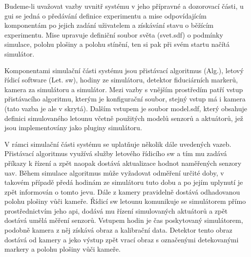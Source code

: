     Budeme-li uvažovat vazby uvnitř systému v jeho přípravné a dozorovací části, u \acrshort{gui} se jedná o předávání definice experimentu a mise odpovídajícím komponentám po jejich zadání uživatelem a získávání stavu o běžícím experimentu. Mise upravuje definiční soubor světa (svet.sdf) o podmínky simulace, polohu plošiny a polohu stínění, ten si pak při svém startu načítá simulátor.

    Komponentami simulační části systému jsou přistávací algoritmus (Alg.), letový řídicí software (Let. \acrshort{sw}), hodiny ze simulátoru, detektor fiduciárních markerů, kamera za simulátoru a simulátor. Mezi vazby s vnějším prostředím patří vstup přistávacího algoritmu, kterým je konfigurační soubor, stejný vstup má i kamera (tato vazba je ale v  skrytá). Dalším vstupem je soubor model.sdf, který obsahuje definici simulovaného letounu včetně použitých modelů senzorů a aktuátorů, jež jsou implementovány jako pluginy simulátoru.

    V rámci simulační části systému se uplatňuje několik dále uvedených vazeb. Přistávací algoritmus využívá služby letového řídicího \acrshort{sw} a tím mu zadává příkazy k řízení a zpět naopak dostává aktualizace hodnot naměřených senzory \acrshort{uav}. Během simulace algoritmus může vyžadovat odměření určité doby, v takovém případě předá hodinám ze simulátoru tuto dobu a po jejím uplynutí je zpět informován o tomto jevu. Dále z kamery pravidelně dostává odhadovanou polohu plošiny vůči kameře. Řídicí \acrshort{sw} letounu komunikuje se simulátorem přímo prostřednictvím jeho \acrshort{api}, dodává mu řízení simulovaných aktuátorů a zpět dostává umělá měření senzorů. Vstupem hodin je čas poskytovaný simulátorem, podobně kamera z něj získává obraz a kalibrační data. Detektor tento obraz dostává od kamery a jeko výstup zpět vrací obraz s označenými detekovanými markery a polohu plošiny vůči kameře.

